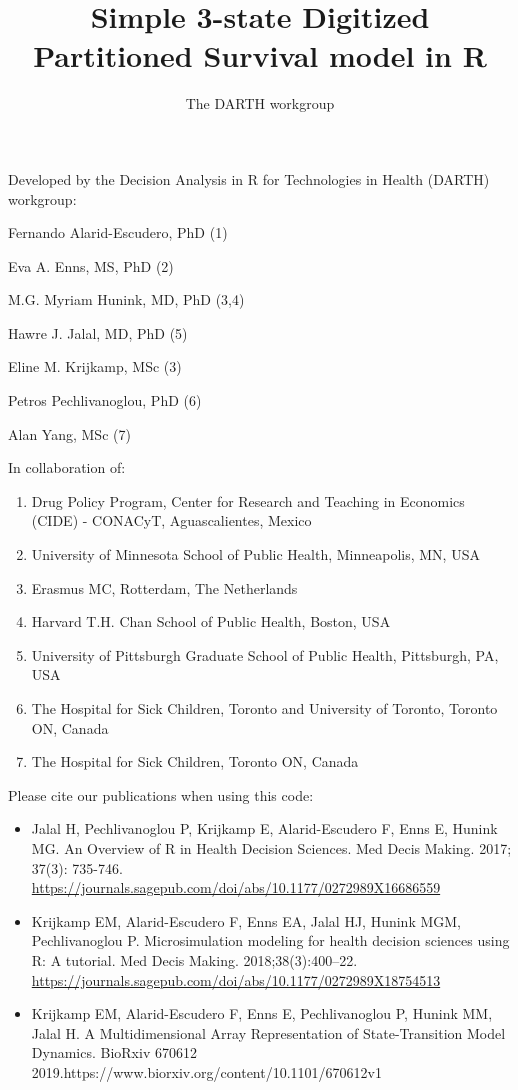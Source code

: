 \documentclass[
]{article}
\title{Simple 3-state Digitized Partitioned Survival model in R}
\author{The DARTH workgroup}
\date{}
\providecommand{\tightlist}{%
  \setlength{\itemsep}{0pt}\setlength{\parskip}{0pt}}
\begin{document}
\maketitle

Developed by the Decision Analysis in R for Technologies in Health
(DARTH) workgroup:

Fernando Alarid-Escudero, PhD (1)

Eva A. Enns, MS, PhD (2)

M.G. Myriam Hunink, MD, PhD (3,4)

Hawre J. Jalal, MD, PhD (5)

Eline M. Krijkamp, MSc (3)

Petros Pechlivanoglou, PhD (6)

Alan Yang, MSc (7)

In collaboration of:

\begin{enumerate}
\def\labelenumi{\arabic{enumi}.}
\tightlist
\item
  Drug Policy Program, Center for Research and Teaching in Economics
  (CIDE) - CONACyT, Aguascalientes, Mexico
\item
  University of Minnesota School of Public Health, Minneapolis, MN, USA
\item
  Erasmus MC, Rotterdam, The Netherlands
\item
  Harvard T.H. Chan School of Public Health, Boston, USA
\item
  University of Pittsburgh Graduate School of Public Health, Pittsburgh,
  PA, USA
\item
  The Hospital for Sick Children, Toronto and University of Toronto,
  Toronto ON, Canada
\item
  The Hospital for Sick Children, Toronto ON, Canada
\end{enumerate}

Please cite our publications when using this code:

\begin{itemize}
\item
  Jalal H, Pechlivanoglou P, Krijkamp E, Alarid-Escudero F, Enns E,
  Hunink MG. An Overview of R in Health Decision Sciences. Med Decis
  Making. 2017; 37(3): 735-746.
  \url{https://journals.sagepub.com/doi/abs/10.1177/0272989X16686559}
\item
  Krijkamp EM, Alarid-Escudero F, Enns EA, Jalal HJ, Hunink MGM,
  Pechlivanoglou P. Microsimulation modeling for health decision
  sciences using R: A tutorial. Med Decis Making. 2018;38(3):400--22.
  \url{https://journals.sagepub.com/doi/abs/10.1177/0272989X18754513}
\item
  Krijkamp EM, Alarid-Escudero F, Enns E, Pechlivanoglou P, Hunink MM,
  Jalal H. A Multidimensional Array Representation of State-Transition
  Model Dynamics. BioRxiv 670612
  2019.https://www.biorxiv.org/content/10.1101/670612v1
\end{itemize}
\end{document}
